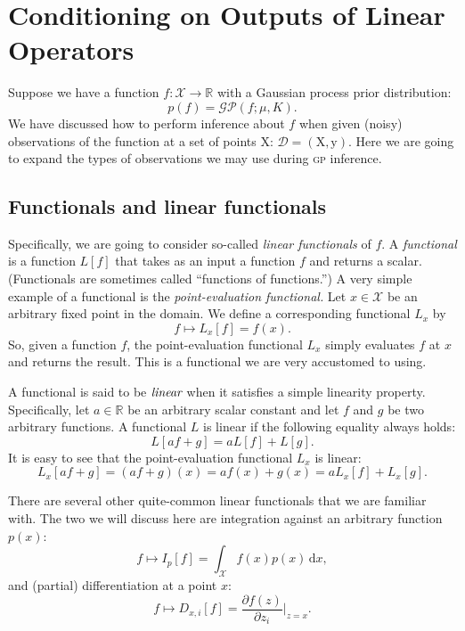 \documentclass{article}
\newcommand{\acro}[1]{\textsc{\MakeLowercase{#1}}}
\newcommand{\mc}[1]{\mathcal{#1}}
\newcommand{\data}{\mc{D}}
\newcommand{\intd}[1]{\,\mathrm{d}{#1}}
\newcommand{\mat}[1]{\bm{\mathrm{#1}}}
\renewcommand{\vec}[1]{\bm{\mathrm{#1}}}
\newcommand{\R}{\mathbb{R}}
\begin{document}
\section*{Conditioning on Outputs of Linear Operators}

Suppose we have a function $f\colon \mc{X} \to \R$ with a Gaussian
process prior distribution:
\begin{equation*}
  p(f) = \mc{GP}(f; \mu, K).
\end{equation*}
We have discussed how to perform inference about $f$ when given
(noisy) observations of the function at a set of points $\mat{X}$:
$\data = (\mat{X}, \vec{y})$.  Here we are going to expand the types
of observations we may use during \acro{GP} inference.

\subsection*{Functionals and linear functionals}

Specifically, we are going to consider so-called \emph{linear
  functionals} of $f$.  A \emph{functional} is a function $L[f]$ that
takes as an input a function $f$ and returns a scalar.  (Functionals
are sometimes called ``functions of functions.'')  A very simple
example of a functional is the \emph{point-evaluation functional.}
Let $x \in \mc{X}$ be an arbitrary fixed point in the domain.  We
define a corresponding functional $L_x$ by
\begin{equation*}
  f \mapsto L_x[f] = f(x).
\end{equation*}
So, given a function $f$, the point-evaluation functional $L_x$ simply
evaluates $f$ at $x$ and returns the result.  This is a functional we
are very accustomed to using.

A functional is said to be $\emph{linear}$ when it satisfies a simple
linearity property.  Specifically, let $a \in \R$ be an arbitrary
scalar constant and let $f$ and $g$ be two arbitrary functions.  A
functional $L$ is linear if the following equality always holds:
\begin{equation*}
  L[af + g] = aL[f] + L[g].
\end{equation*}
It is easy to see that the point-evaluation functional $L_x$ is
linear:
\begin{equation*}
  L_x[af + g]
  =
  (af + g)(x)
  =
  af(x) + g(x)
  =
  aL_x[f] + L_x[g].
\end{equation*}

There are several other quite-common linear functionals that we are
familiar with.  The two we will discuss here are integration against
an arbitrary function $p(x)$:
\begin{equation*}
  f \mapsto I_p[f] = \int_{\mc{X}} f(x) p(x) \intd{x},
\end{equation*}
and (partial) differentiation at a point $x$:
\begin{equation*}
  f \mapsto D_{x, i}[f] = \frac{\partial f(z)}{\partial z_i} \biggr\rvert_{z = x}.
\end{equation*}
\end{document}
